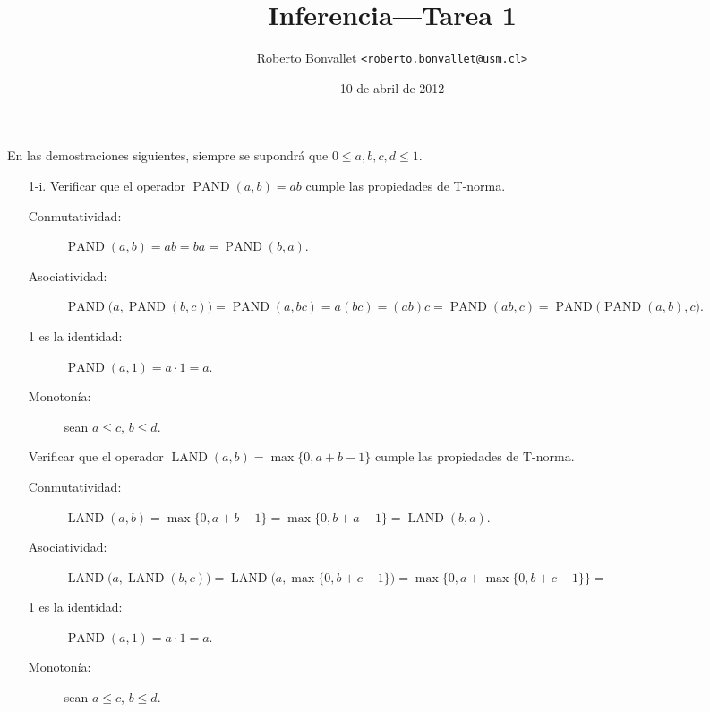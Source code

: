 \documentclass{article}
\title{Inferencia---Tarea 1}
\author{Roberto Bonvallet \texttt{<roberto.bonvallet@usm.cl>}}
\date{10 de abril de 2012}
\DeclareMathOperator{\LAND}{LAND}
\DeclareMathOperator{\PAND}{PAND}
\begin{document}
\maketitle

En las demostraciones siguientes,
siempre se supondrá que
\(0 ≤ a, b, c, d ≤ 1\).

\begin{enumerate}[
  label=\arabic*.,
  font=\LARGE\bfseries,%
  labelindent=-.5in,%
  leftmargin=0pt,%
  labelsep=1em%
]

  \item[1-i.]
    Verificar que el operador \(\PAND(a, b) = ab\)
    cumple las propiedades de T-norma.
    \begin{description}
      \item[Conmutatividad:]
        \(
          \PAND(a, b) =
          ab =
          ba =
          \PAND(b, a).
        \)
      \item[Asociatividad:]
        \(
          \PAND\bigl(a, \PAND(b, c)\bigr) =
          \PAND(a, bc) =
          a(bc) =
          (ab)c =
          \PAND(ab, c) =
          \PAND\bigl(\PAND(a, b), c\bigr).
        \)
      \item[1 es la identidad:]
        \(
          \PAND(a, 1) = a\cdot 1 = a.
        \)
      \item[Monotonía:] sean \(a ≤ c\), \(b ≤ d\).

    \end{description}

    Verificar que el operador \(\LAND(a, b) = \max\{0, a + b - 1\}\)
    cumple las propiedades de T-norma.
    \begin{description}
      \item[Conmutatividad:]
        \(
          \LAND(a, b) =
          \max\{0, a + b - 1\} =
          \max\{0, b + a - 1\} =
          \LAND(b, a).
        \)
      \item[Asociatividad:]
        \(
          \LAND\bigl(a, \LAND(b, c)\bigr) =
          \LAND\bigl(a, \max\{0, b + c - 1\}\bigr) =
          \max\bigl\{0, a + \max\{0, b + c - 1\}\bigl\} =
        \)
      \item[1 es la identidad:]
        \(
          \PAND(a, 1) = a\cdot 1 = a.
        \)
      \item[Monotonía:] sean \(a ≤ c\), \(b ≤ d\).

    \end{description}


\end{enumerate}
\end{document}
